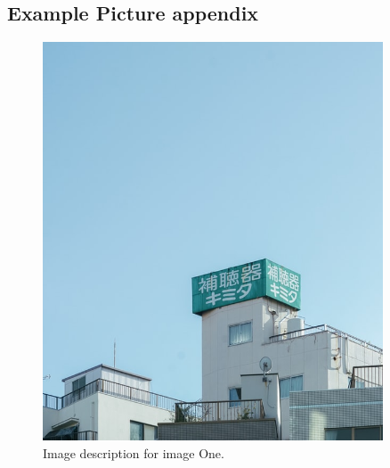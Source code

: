 \documentclass[
    a4paper,
    doc,
    11pt,
]{apa6}
\begin{document}
\newpage
\begin{appendices}
\setcounter{section}{1}


\begingroup
    \centering
    
    \label{append:lorem_ipsum}
\endgroup

\newpage
\subsection{Example Picture appendix}
\begingroup
    \begin{figure}[h!]
        \centering
        \label{append:pic:one}
        \includegraphics[width=0.9\textwidth]{appendix/imageExample/pOne.jpg}
        \caption{Image description for image One.}
    \end{figure}

\end{appendices}
\end{document}
